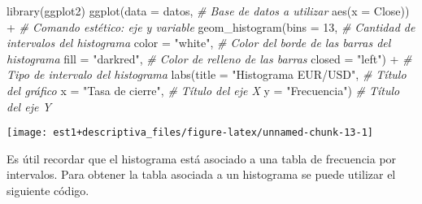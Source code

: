 \documentclass[
]{book}
\newenvironment{Shaded}{\begin{snugshade}}{\end{snugshade}}
\newcommand{\AttributeTok}[1]{\textcolor[rgb]{0.77,0.63,0.00}{#1}}
\newcommand{\CommentTok}[1]{\textcolor[rgb]{0.56,0.35,0.01}{\textit{#1}}}
\newcommand{\DecValTok}[1]{\textcolor[rgb]{0.00,0.00,0.81}{#1}}
\newcommand{\FunctionTok}[1]{\textcolor[rgb]{0.00,0.00,0.00}{#1}}
\newcommand{\NormalTok}[1]{#1}
\newcommand{\OtherTok}[1]{\textcolor[rgb]{0.56,0.35,0.01}{#1}}
\newcommand{\SpecialCharTok}[1]{\textcolor[rgb]{0.00,0.00,0.00}{#1}}
\newcommand{\StringTok}[1]{\textcolor[rgb]{0.31,0.60,0.02}{#1}}
\begin{document}
\begin{Shaded}
\begin{Highlighting}[]
\FunctionTok{library}\NormalTok{(ggplot2)}
\FunctionTok{ggplot}\NormalTok{(}\AttributeTok{data =}\NormalTok{ datos, }\CommentTok{\# Base de datos a utilizar}
       \FunctionTok{aes}\NormalTok{(}\AttributeTok{x =}\NormalTok{ Close)) }\SpecialCharTok{+} \CommentTok{\# Comando estético: eje y variable}
  \FunctionTok{geom\_histogram}\NormalTok{(}\AttributeTok{bins =} \DecValTok{13}\NormalTok{, }\CommentTok{\# Cantidad de intervalos del histograma}
                 \AttributeTok{color =} \StringTok{"white"}\NormalTok{, }\CommentTok{\# Color del borde de las barras del histograma}
                 \AttributeTok{fill =} \StringTok{"darkred"}\NormalTok{, }\CommentTok{\# Color de relleno de las barras}
                 \AttributeTok{closed =} \StringTok{"left"}\NormalTok{) }\SpecialCharTok{+} \CommentTok{\# Tipo de intervalo del histograma}
  \FunctionTok{labs}\NormalTok{(}\AttributeTok{title =} \StringTok{"Histograma EUR/USD"}\NormalTok{, }\CommentTok{\# Título del gráfico}
       \AttributeTok{x =} \StringTok{"Tasa de cierre"}\NormalTok{, }\CommentTok{\# Título del eje X}
       \AttributeTok{y =} \StringTok{"Frecuencia"}\NormalTok{) }\CommentTok{\# Título del eje Y}
\end{Highlighting}
\end{Shaded}

\begin{center}\texttt{[image: est1+descriptiva\_files/figure-latex/unnamed-chunk-13-1]} \end{center}

Es útil recordar que el histograma está asociado a una tabla de frecuencia por intervalos. Para obtener la tabla asociada a un histograma se puede utilizar el siguiente código.

\begin{Shaded}
\end{Shaded}
\end{document}
